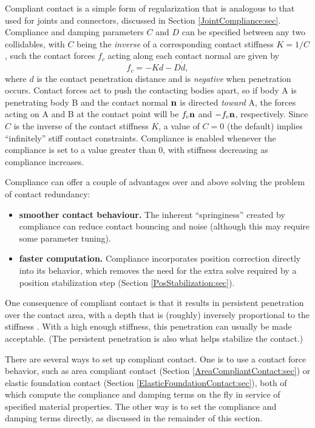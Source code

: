 Compliant contact is a simple form of regularization that is analogous
to that used for joints and connectors, discussed in Section
\ref{JointCompliance:sec}.  Compliance and damping parameters $C$ and
$D$ can be specified between any two collidables, with $C$ being the
{\it inverse} of a corresponding contact stiffness $K = 1/C$, such the
contact forces $f_c$ acting along each contact normal are given by
%
\begin{equation}
f_c = - K d - D \dot d,
\label{contactForce:eqn}
\end{equation}
%
where $d$ is the contact penetration distance and is {\it negative}
when penetration occurs. Contact forces act to push the contacting
bodies apart, so if body A is penetrating body B and the contact
normal ${\bf n}$ is directed {\it toward} A, the forces acting on A and B
at the contact point will be $f_c {\bf n}$ and $-f_c {\bf n}$, respectively.
Since $C$ is the inverse of the contact stiffness $K$, a value of $C =
0$ (the default) implies ``infinitely'' stiff contact
constraints. Compliance is enabled whenever the compliance is set
to a value greater than 0, with stiffness decreasing as compliance
increases.

Compliance can offer a couple of advantages over and above solving the problem
of contact redundancy:

\begin{itemize}

\item {\bf smoother contact behaviour.} The inherent ``springiness'' created by
compliance can reduce contact bouncing and noise (although this may require
some parameter tuning).

\item {\bf faster computation.} Compliance incorporates position correction
directly into its behavior, which removes the need for the extra solve required
by a position stabilization step (Section \ref{PosStabilization:sec}).

\end{itemize}

One consequence of compliant contact is that it results in persistent
penetration over the contact area, with a depth that is (roughly) inversely
proportional to the stiffness . With a high enough stiffness, this penetration
can usually be made acceptable. (The persistent penetration is also what helps
stabilize the contact.)

There are several ways to set up compliant contact. One is to use a contact
force behavior, such as area compliant contact (Section
\ref{AreaCompliantContact:sec}) or elastic foundation contact (Section
\ref{ElasticFoundationContact:sec}), both of which compute the compliance and
damping terms on the fly in service of specified material properties.  The
other way is to set the compliance and damping terms directly, as discussed in
the remainder of this section.

